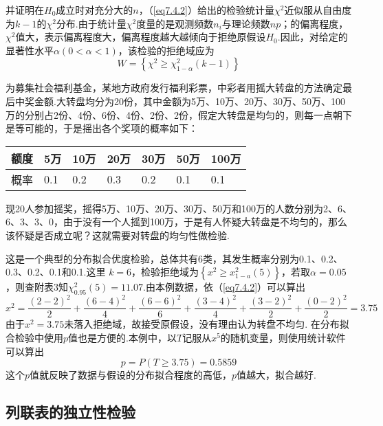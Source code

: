 并证明在$H_{0}$成立时对充分大的$n$，（\ref{eq7.4.2}）给出的检验统计量$\chi^{2}$近似服从自由度为$k-1$的$\chi^{2}$分布.由于统计量$\chi^{2}$度量的是观测频数$n_{i}$与理论频数$np$；的偏离程度，$\chi^{2}$值大，表示偏离程度大，偏离程度越大越倾向于拒绝原假设$H_{0}$.因此，对给定的显著性水平$\alpha(0<\alpha<1)$，该检验的拒绝域应为
\begin{equation}\label{eq7.4.3}
W=\left\{\chi^2\geq\chi_{1-\alpha}^{2}\left(k-1\right)\right\}
\end{equation}
\begin{example}\label{exam7.4.1}
	为募集社会福利基金，某地方政府发行福利彩票，中彩者用摇大转盘的方法确定最后中奖金额.大转盘均分为20份，其中金额为5万、10万、20万、30万、50万、100万的分别占2份、4份、6份、4份、2份、2份，假定大转盘是均匀的，则每一点朝下是等可能的，于是摇出各个奖项的概率如下：
	
	\begin{table}[!htp]
		\centering
		\begin{tabularx}{1.0\textwidth}{Z|ZZZZZZ}
			额度&5万&10万&20万&30万&50万&100万\\
			\midrule
			概率&0.1&0.2&0.3&0.2&0.1&0.1
		\end{tabularx}
	\end{table}
	现20人参加摇奖，摇得5万、10万、20万、30万、50万和100万的人数分别为2、6、6、3、3、0，由于没有一个人摇到100万，于是有人怀疑大转盘是不均匀的，那么该怀疑是否成立呢？这就需要对转盘的均匀性做检验.
\end{example}
\begin{solution}
这是一个典型的分布拟合优度检验，总体共有6类，其发生概率分别为0.1、0.2、0.3、0.2、0.1和0.1.这里 $k=6$，检验拒绝域为$\left\{ x ^ { 2 } \geq x _ { 1 - a } ^ { 2 } ( 5 ) \right\}$，若取$\alpha=0.05$，则查附表3知$\chi _ { 0.95 } ^ { 2 } ( 5 ) = 11.07$.由本例数据，依（\ref{eq7.4.2}）可以算出
\[x ^ { 2 } = \frac { ( 2 - 2 ) ^ { 2 } } { 2 } + \frac { ( 6 - 4 ) ^ { 2 } } { 4 } + \frac { ( 6 - 6 ) ^ { 2 } } { 6 } + \frac { ( 3 - 4 ) ^ { 2 } } { 4 } +\frac { ( 3 - 2 ) ^ { 2 } } { 2 } + \frac { ( 0 - 2 ) ^ { 2 } } { 2 } = 3.75\]
由于$x ^ { 2 } = 3.75$未落入拒绝域，故接受原假设，没有理由认为转盘不均匀.
在分布拟合检验中使用$p$值也是方便的.本例中，以$T$记服从$x ^ {5}$的随机变量，则使用统计软件可以算出
\[p = P ( T \geq 3.75 ) = 0.5859\]
这个$p$值就反映了数据与假设的分布拟合程度的高低，$p$值越大，拟合越好.
\end{solution}
\subsection{列联表的独立性检验\label{sec:7.3.2}}
